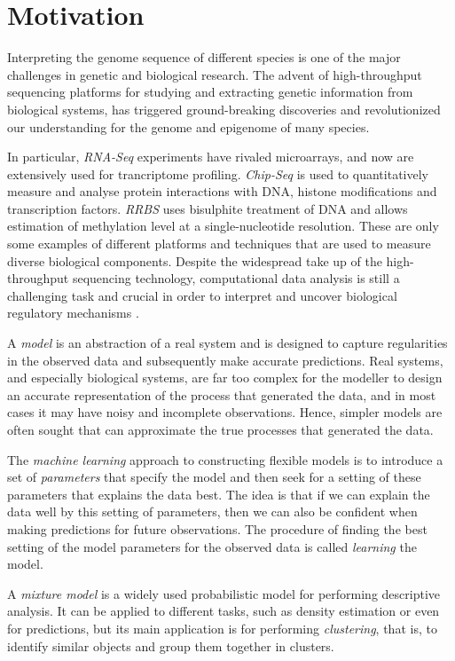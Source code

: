 \section{Motivation} \label{motivation-intro-l}
Interpreting the genome sequence of different species is one of the major challenges in genetic and biological research. The advent of high-throughput sequencing platforms for studying and extracting genetic information from biological systems, has triggered ground-breaking discoveries and revolutionized our understanding for the genome and epigenome of many species. 

In particular, \emph{RNA-Seq} experiments \citep{Wang2009} have rivaled microarrays, and now are extensively used for trancriptome profiling. \emph{Chip-Seq} \citep{Park2009} is used to quantitatively measure and analyse protein interactions with DNA, \ie histone modifications and transcription factors. \emph{RRBS} \citep{Meissner2005} uses bisulphite treatment of DNA and allows estimation of methylation level at a single-nucleotide resolution. These are only some examples of different platforms and techniques that are used to measure diverse biological components. Despite the widespread take up of the high-throughput sequencing technology, computational data analysis is still a challenging task and crucial in order to interpret and uncover biological regulatory mechanisms \citep{Park2009}.

A \emph{model} is an abstraction of a real system and is designed to capture regularities in the observed data and subsequently make accurate predictions. Real systems, and especially biological systems, are far too complex for the modeller to design an accurate representation of the process that generated the data, and in most cases it may have noisy and incomplete observations. Hence, simpler models are often sought that can approximate the true processes that generated the data.

The \emph{machine learning} approach to constructing flexible models is to introduce a set of \emph{parameters} that specify the model and then seek for a setting of these parameters that explains the data best. The idea is that if we can explain the data well by this setting of parameters, then we can also be confident when making predictions for future observations. The procedure of finding the best setting of the model parameters for the observed data is called \emph{learning} the model.

A \emph{mixture model} is a widely used probabilistic model for performing descriptive analysis. It can be applied to different tasks, such as density estimation or even for predictions, but its main application is for performing \emph{clustering}, that is, to identify similar objects and group them together in clusters. 

